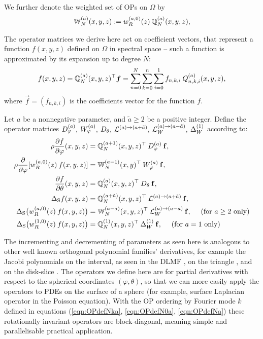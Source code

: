 \documentclass[11pt, oneside]{article}   	%
\begin{document}
We further denote the weighted set of OPs on $\Omega$ by 
\begin{align*}
	\mathbb{W}_N^{(a)}(x,y,z) := w_R^{(a,0)}(z) \: {\mathbb{Q}}^{(a)}_{N}(x,y,z),
\end{align*}

The operator matrices we derive here act on coefficient vectors, that represent a function $f(x,y,z)$ defined on $\Omega$ in spectral space -- such a function is approximated by its expansion up to degree $N$: 
\begin{align*}
	f(x,y,z) = {\mathbb{Q}}^{(a)}_{N}(x,y,z)^\top \bm{f} = \sum_{n=0}^{N} \sum_{k=0}^{n} \sum_{i=0}^{1} f_{n,k,i} \: Q_{n,k,i}^{(a)}(x,y,z),
\end{align*}
where $\vec f = (f_{n,k,i})$ is the coefficients vector for the function $f$.

\begin{definition}\label{def:differentialoperators}
	Let $a$ be a nonnegative parameter, and $\tilde a \ge 2$ be a positive integer. Define the operator matrices $D_\varphi^{(a)}, \: W_\varphi^{(a)}, \: D_\theta, \: \mathcal{L}^{(a)\to(a+\tilde a)}, \: \mathcal{L}_W^{(a)\to(a-\tilde a)}, \: \Delta^{(1)}_W$ according to:
\begin{align*}
	\rho {\partial f \over \partial \varphi} (x,y,z)&= {\mathbb{Q}}_N^{(a+1)}(x,y,z)^\top \: D_\varphi^{(a)} \: \mathbf{f}, \\
	\rho {\partial \over \partial \varphi}[w_R^{(a,0)}(z) \: f(x,y,z)] &= \mathbb{W}_N^{(a-1)}(x,y)^\top \: W_\varphi^{(a)}\: \mathbf{f}, \\
	{\partial f \over \partial \theta}(x,y,z) &= {\mathbb{Q}}^{(a)}_{N}(x,y,z)^\top \: D_\theta \: \mathbf{f}, \\
	\Delta_{\rm S} f(x,y,z) &= {\mathbb{Q}}_{N}^{(a+\tilde a)}(x,y,z)^\top \: \mathcal{L}^{(a)\to(a+\tilde a)} \: \mathbf{f}, \\
	\Delta_{\rm S} \big( w_R^{(a,0)}(z) \: f(x,y,z) \big) &= \mathbb{W}_N^{(a-\tilde a)}(x,y,z)^\top \: \mathcal{L}_W^{(a)\to(a-\tilde a)} \: \mathbf{f},  \quad \text{ (for } a \ge 2 \text{ only)} \\
	\Delta_{\rm S} \big( w_R^{(1,0)}(z) \: f(x,y,z) \big) &= {\mathbb{Q}}_{N}^{(1)}(x,y,z)^\top \: \Delta^{(1)}_W \: \mathbf{f}, \quad \text{ (for } a = 1 \text{ only)}
\end{align*}
\end{definition}

The incrementing and decrementing of parameters as seen here is analogous to other well known orthogonal polynomial families' derivatives, for example the Jacobi polynomials on the interval, as seen in the DLMF \cite[(18.9.3)]{DLMF}, on the triangle \cite{olver2018recurrence}, and on the disk-slice \cite{snowball2019sparse}. The operators we define here are for partial derivatives with respect to the spherical coordinates $(\varphi, \theta)$, so that we can more easily apply the operators to PDEs on the surface of a sphere (for example, surface Laplacian operator in the Poisson equation). With the OP ordering by Fourier mode $k$ defined in equations (\ref{eqn:OPdefNka}, \ref{eqn:OPdefN0a}, \ref{eqn:OPdefNa}) these rotationally invariant operators are block-diagonal, meaning simple and parallelisable practical application.
\end{document}
